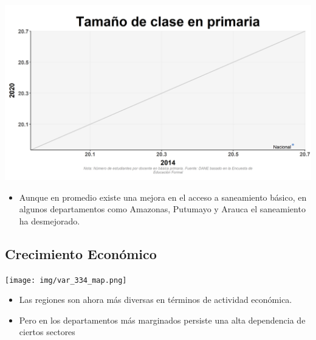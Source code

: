 \documentclass[aspectratio=169]{beamer}
\begin{document}
    \begin{slide}{7} 
                      \begin{imagecolumn}
                \includegraphics[width=\columnwidth]{img/var_229_scatter_time.png}
            \end{imagecolumn}
            \begin{textcolumn}
                \begin{itemize}
                    \item Aunque en promedio existe una mejora en el acceso a saneamiento básico, en algunos departamentos como Amazonas, Putumayo y Arauca el saneamiento ha desmejorado. 
                \end{itemize}
            \end{textcolumn}

    \printcolumns
    \end{slide}
    
    
    \subsection{Crecimiento Económico}
    
    \begin{slide}{8} 
                      \begin{imagecolumn}
                \texttt{[image: img/var\_334\_map.png]}
            \end{imagecolumn}
            \begin{textcolumn}
                \begin{itemize}
                    \item Las regiones son ahora más diversas en términos de actividad económica.
                    \item Pero en los departamentos más marginados persiste una alta dependencia de ciertos sectores
                \end{itemize}
            \end{textcolumn}

    \printcolumns
    \end{slide}
    
\end{document}

